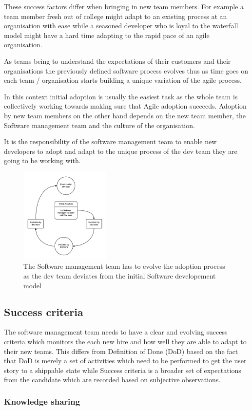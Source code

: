 \documentclass[12pt,conference]{IEEEtran}
\begin{document}
These success factors differ when bringing in new team members. For example a team member fresh out of college might adapt to an existing process at an organisation with ease while a seasoned developer who is loyal to the waterfall model might have a hard time adapting to the rapid pace of an agile organisation. 

As teams being to understand the expectations of their customers and their organisations the previously defined software process evolves thus as time goes on each team / organisation starts building a unique variation of the agile process.

In this context initial adoption is usually the easiest task as the whole team is collectively working towards making sure that Agile adoption succeeds. Adoption by new team members on the other hand depends on the new team member, the Software management team and the culture of the organisation.

It is the responsibility of the software management team to enable new developers to adopt and adapt to the unique process of the dev team they are going to be working with.

\begin{figure}[t]
\centering
\includegraphics[width=0.4\textwidth]{sm_dev_team_process_evolution.png}
\caption{The Software management team has to evolve the adoption process as the dev team deviates from the initial Software developement model}
\end{figure}





\subsection*{Success criteria} The software management team needs to have a clear and evolving success criteria which monitors the each new hire and how well they are able to adapt to their new teams. This differs from Definition of Done (DoD) based on the fact that DoD is merely a set of activities which need to be performed to get the user story to a shippable state while Success criteria is a broader set of expectations from the candidate which are recorded based on subjective observations. 

\subsubsection*{Knowledge sharing}
\cite{cabrera_fostering_2005}








\end{document}
